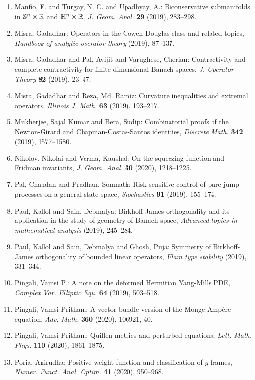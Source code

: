 \begin{enumerate}
\item Manfio, F. and Turgay, N. C. and Upadhyay, A.: Biconservative submanifolds in {$\Bbb{S}^n\times\Bbb{R}$} and
{$\Bbb{H}^n\times\Bbb{R}$}, \emph{J. Geom. Anal.} {\bf 29} (2019), 283--298.
\item Misra, Gadadhar: Operators in the {C}owen-{D}ouglas class and related topics, \emph{Handbook of analytic operator theory} {\bf } (2019), 87--137.
\item Misra, Gadadhar and Pal, Avijit and Varughese, Cherian: Contractivity and complete contractivity for finite
dimensional {B}anach spaces, \emph{J. Operator Theory} {\bf 82} (2019), 23--47.
\item Misra, Gadadhar and Reza, Md. Ramiz: Curvature inequalities and extremal operators, \emph{Illinois J. Math.} {\bf 63} (2019), 193--217.
\item Mukherjee, Sajal Kumar and Bera, Sudip: Combinatorial proofs of the {N}ewton-{G}irard and
{C}hapman-{C}ostas-{S}antos identities, \emph{Discrete Math.} {\bf 342} (2019), 1577--1580.
\item Nikolov, Nikolai and Verma, Kaushal: On the squeezing function and {F}ridman invariants, \emph{J. Geom. Anal.} {\bf 30} (2020), 1218--1225.
\item Pal, Chandan and Pradhan, Somnath: Risk sensitive control of pure jump processes on a general
state space, \emph{Stochastics} {\bf 91} (2019), 155--174.
\item Paul, Kallol and Sain, Debmalya: Birkhoff-{J}ames orthogonality and its application in the
study of geometry of {B}anach space, \emph{Advanced topics in mathematical analysis} {\bf } (2019), 245--284.
\item Paul, Kallol and Sain, Debmalya and Ghosh, Puja: Symmetry of {B}irkhoff-{J}ames orthogonality of bounded linear
operators, \emph{Ulam type stability} {\bf } (2019), 331--344.
\item Pingali, Vamsi P.: A note on the deformed {H}ermitian {Y}ang-{M}ills {PDE}, \emph{Complex Var. Elliptic Equ.} {\bf 64} (2019), 503--518.
\item Pingali, Vamsi Pritham: A vector bundle version of the {M}onge-{A}mp\`ere equation, \emph{Adv. Math.} {\bf 360} (2020), 106921, 40.
\item Pingali, Vamsi Pritham: Quillen metrics and perturbed equations, \emph{Lett. Math. Phys.} {\bf 110} (2020), 1861--1875.
\item Poria, Anirudha: Positive weight function and classification of {$g$}-frames, \emph{Numer. Funct. Anal. Optim.} {\bf 41} (2020), 950--968.

\end{enumerate}
